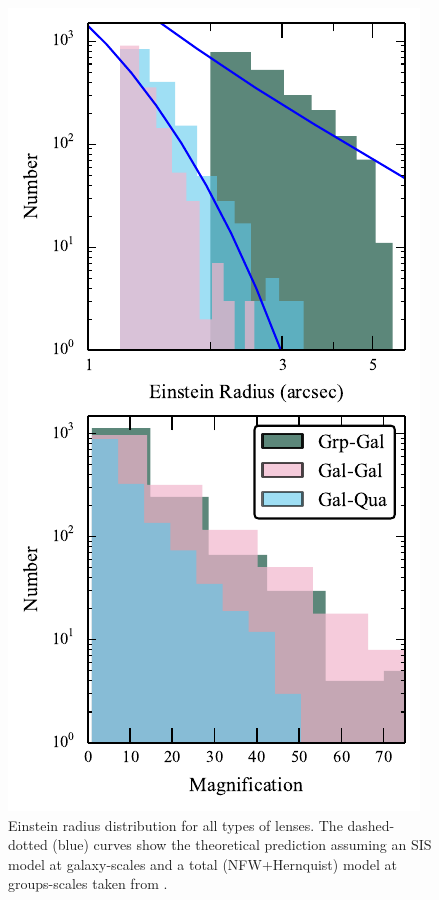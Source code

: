 \documentclass[useAMS,usenatbib,a4paper]{mn2e}
\begin{document}
\begin{figure}
\begin{center}
\includegraphics[scale=0.85]{sw-cfhtls-figs/distrib_remu.pdf}
\caption{ \label{fig:remudist}
Einstein radius distribution for all types of lenses. The dashed-dotted (blue)
curves show the theoretical prediction assuming an SIS model at galaxy-scales
and a total (NFW+Hernquist) model at groups-scales taken from \citep{More2012}.
}
\end{center}
\end{figure}
\end{document}
